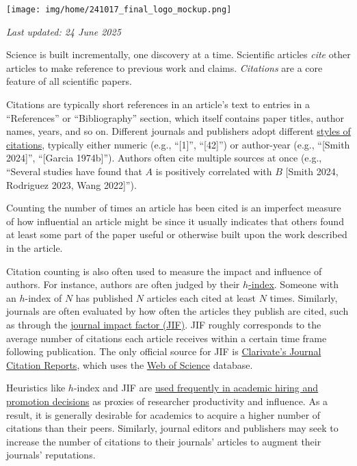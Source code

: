 \documentclass[letterpaper, 12pt]{article}
\begin{document}
\flushleft\texttt{[image: img/home/241017\_final\_logo\_mockup.png]}

\textit{Last updated: 24 June 2025}

Science is built incrementally, one discovery at a time.
Scientific articles \emph{cite} other articles to make reference to previous work and claims.
\emph{Citations} are a core feature of all scientific papers.

Citations are typically short references in an article's text to entries in a ``References'' or ``Bibliography'' section,
which itself contains paper titles, author names, years, and so on.
Different journals and publishers adopt different \href{https://libguides.brown.edu/citations/styles}{styles of citations}, typically either numeric (e.g., ``[1]'', ``[42]'')
or author-year (e.g., ``[Smith 2024]'', ``[Garcia 1974b]''). Authors often cite multiple sources at once (e.g., ``Several studies have found that $A$ is positively correlated with $B$ [Smith 2024, Rodriguez 2023, Wang 2022]'').

Counting the number of times an article has been cited is an imperfect measure of how influential an article might be since it usually indicates that others found at least some part of the paper useful or otherwise built upon the work described in the article.

Citation counting is also often used to measure the impact and influence of authors. For instance, authors are often judged by their \href{https://doi.org/10.1073%2Fpnas.0507655102}{$h$-index}.
Someone with an $h$-index of $N$ has published $N$ articles each cited at least $N$ times. Similarly, journals are often evaluated by how often the articles they publish are cited, such as through the \href{https://doi.org/10.1001%2Fjama.295.1.90}{journal impact factor (JIF)}. JIF roughly corresponds to the average number of citations each article receives within a certain time frame following publication. The only official source for JIF is \href{https://clarivate.com/academia-government/scientific-and-academic-research/research-funding-analytics/journal-citation-reports/}{Clarivate's Journal Citation Reports}, which uses the \href{https://clarivate.com/academia-government/scientific-and-academic-research/research-discovery-and-referencing/web-of-science/}{Web of Science} database.

Heuristics like $h$-index and JIF are \href{https://doi.org/10.1038/d41586-022-02984-2}{used frequently in academic hiring and promotion decisions} as proxies of researcher productivity and influence. As a result, it is generally desirable for academics to acquire a higher number of citations than their peers. Similarly, journal editors and publishers may seek to increase the number of citations to their journals' articles to augment their journals' reputations.
\end{document}
